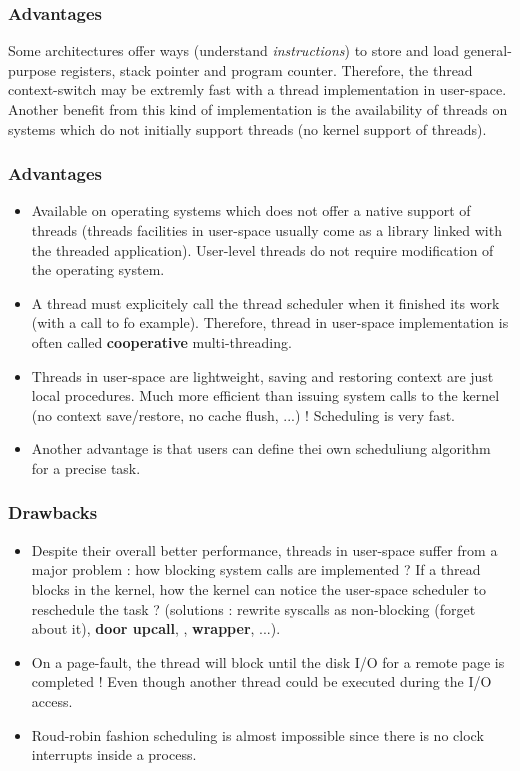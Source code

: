 
\begin{frame}
  \frametitle{Advantages}

Some architectures offer ways (understand \textit{instructions}) to store and load general-purpose registers, stack pointer and program counter. Therefore, the thread context-switch may be extremly fast with a thread implementation in user-space. Another benefit from this kind of implementation is the availability of threads on systems which do not initially support threads (no kernel support of threads).

\end{frame}


\begin{frame}
  \frametitle{Advantages}

\begin{itemize}
\item
Available on operating systems which does not offer a native support of threads (threads facilities in user-space usually come as a library linked with the threaded application). User-level threads do not require modification of the operating system.
\item
A thread must explicitely call the thread scheduler when it finished its work (with a call to  fo example). Therefore, thread in user-space implementation is often called \textbf{cooperative} multi-threading.
\item
Threads in user-space are lightweight, saving and restoring context are just local procedures. Much more efficient than issuing system calls to the kernel (no context save/restore, no cache flush, ...) ! Scheduling is very fast.
\item
Another advantage is that users can define thei own scheduliung algorithm for a precise task.
\end{itemize}

\end{frame}


\begin{frame}
  \frametitle{Drawbacks}

\begin{itemize}
\item
Despite their overall better performance, threads in user-space suffer from a major problem : how blocking system calls are implemented ? If a thread blocks in the kernel, how the kernel can notice the user-space scheduler to reschedule the task ? (solutions : rewrite syscalls as non-blocking (forget about it), \textbf{door upcall}, \etc{}, \textbf{wrapper}, ...).
\item
On a page-fault, the thread will block until the disk I/O for a remote page is completed ! Even though another thread could be executed during the I/O access.
\item
Roud-robin fashion scheduling is almost impossible since there is no clock interrupts inside a process.
\end{itemize}

\end{frame}

